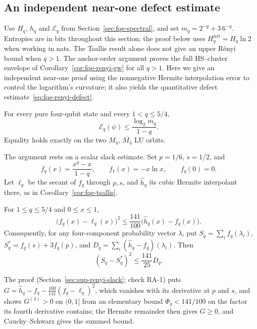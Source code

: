 \subsection{An independent near-one defect estimate}\label{sec:fqe-renyi-above-one}

Use $H_q$, $h_q$ and $\mathcal E_q$ from Section~\ref{sec:fqe-spectral}, and set
$m_q=2^{-q}+3\,6^{-q}$. Entropies are in bits throughout this section; the proof below uses
$H_q^{\mathrm{nat}}=H_q\ln2$ when working in nats.
The Tsallis result alone does not give an upper R\'enyi bound when $q>1$.
The anchor-order argument proves the full HS--cluster envelope of Corollary~\ref{cor:fqe-renyi-gw} for all $q>1$.
Here we give an independent near-one proof using the nonnegative Hermite interpolation error to control
the logarithm's curvature; it also yields the quantitative defect estimate~\eqref{eq:fqe-renyi-defect}.

\begin{theorem}
\label{thm:fqe-renyi-above-one}
For every pure four-qubit state and every $1<q\le5/4$,
\[
\boxed{\quad\mathcal E_q(\psi)\le\frac{\log_2 m_q}{1-q}.\quad}
\]
Equality holds exactly on the two $M_4$, $\overline{M_4}$ LU orbits.
\end{theorem}


The argument rests on a scalar slack estimate. Set $p=1/6$, $s=1/2$, and
\[
f_q(x)=\frac{x^q-x}{1-q},\qquad f_1(x)=-x\ln x,\qquad f_q(0)=0.
\]
Let $\ell_q$ be the secant of $f_q$ through $p,s$, and $\widehat h_q$ its cubic
Hermite interpolant there, as in Corollary~\ref{cor:fqe-tsallis}.

\begin{lemma}
\label{lem:fqe-renyi-slack}
For $1\le q\le5/4$ and $0\le x\le1$,
\[
 \bigl(f_q(x)-\ell_q(x)\bigr)^2
 \le\frac{141}{100}\bigl(\widehat h_q(x)-f_q(x)\bigr).
 \tag{RA}\label{eq:fqe-renyi-scalar}
\]
Consequently, for any four-component probability vector $\lambda$, put
$S_q=\sum_i f_q(\lambda_i)$, $S_q^*=f_q(s)+3f_q(p)$,
and $D_q=\sum_i(\widehat h_q-f_q)(\lambda_i)$. Then
\[
 (S_q-S_q^*)^2\le\frac{141}{25}D_q.
 \tag{RB}\label{eq:fqe-renyi-sum}
\]
\end{lemma}
The proof (Section~\ref{sec:sup-renyi-slack}; check RA-1) puts
$G=\widehat h_q-f_q-\frac{100}{141}(f_q-\ell_q)^2$, which vanishes with its derivative at $p$ and $s$, and shows
$G^{(4)}>0$ on $(0,1]$ from an elementary bound $\Phi_q<141/100$ on the factor its fourth derivative contains;
the Hermite remainder then gives $G\ge0$, and Cauchy--Schwarz gives the summed bound.

